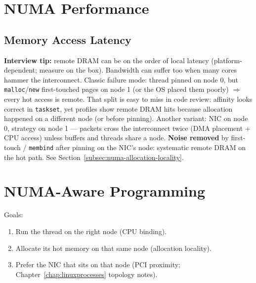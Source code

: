 \section{NUMA Performance}
\label{sec:numa-performance}

\subsection{Memory Access Latency}
\label{subsec:numa-memory-latency}
\par\noindent\textbf{Interview tip:} remote DRAM can be on the order of 
 local latency (platform-dependent; measure on the box). 
Bandwidth can suffer too when many cores hammer the interconnect.
\newline
Classic failure mode: thread pinned on node 0, but \texttt{malloc}/\texttt{new} first-touched 
pages on node 1 (or the OS placed them poorly) $\Rightarrow$ every hot access is remote.
\newline
That split is easy to miss in code review: affinity looks correct in \texttt{taskset}, yet 
profiles show remote DRAM hits because allocation happened on a different node (or before 
pinning). Another variant: NIC on node 0, strategy on node 1 --- packets cross the 
interconnect twice (DMA placement + CPU access) unless buffers and threads share a node.
\newline
\textbf{Noise removed} by first-touch / \texttt{membind} after pinning on the NIC's node: 
systematic remote DRAM on the hot path. See Section~\ref{subsec:numa-allocation-locality}.

\section{NUMA-Aware Programming}
\label{sec:numa-aware-programming}
Goals:
\begin{enumerate}
    \item Run the thread on the right node (CPU binding).
    \item Allocate its hot memory on that same node (allocation locality).
    \item Prefer the NIC that sits on that node (PCI proximity; Chapter~\ref{chap:linuxprocesses} topology notes).
\end{enumerate}

